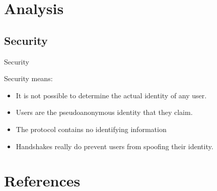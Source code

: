 \documentclass{beamer}
\begin{document}
\section{Analysis}

\subsection{Security}
\begin{frame}{Security}
\begin{block}{Security means:}
\begin{itemize}
\pause
\item It is not possible to determine the actual identity of any user.
\pause
\item Users are the pseudoanonymous identity that they claim.
\end{itemize}
\end{block}

\begin{block}{}
\begin{itemize}
\pause
\item The protocol contains no identifying information

\pause
\item Handshakes really do prevent users from spoofing their identity.

\end{itemize}
\end{block}
\end{frame}

\appendix
\section{References}
~\nocite{tor-design}


\end{document}
